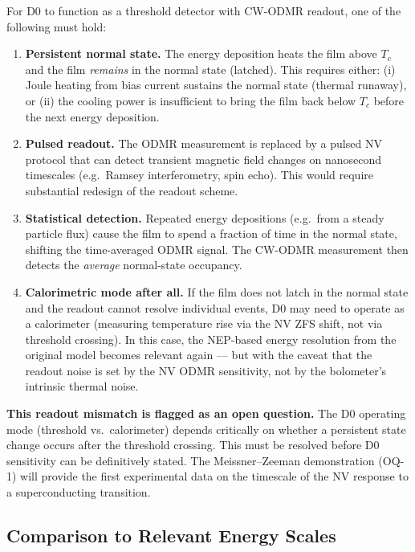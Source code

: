 For D0 to function as a threshold detector with CW-ODMR readout, one of the
following must hold:

\begin{enumerate}
  \item[(a)] \textbf{Persistent normal state.} The energy deposition heats
    the film above $T_c$ and the film \emph{remains} in the normal state
    (latched). This requires either: (i) Joule heating from bias current
    sustains the normal state (thermal runaway), or (ii) the cooling power
    is insufficient to bring the film back below $T_c$ before the next
    energy deposition.

  \item[(b)] \textbf{Pulsed readout.} The ODMR measurement is replaced by a
    pulsed NV protocol that can detect transient magnetic field changes on
    nanosecond timescales (e.g.\ Ramsey interferometry, spin echo). This
    would require substantial redesign of the readout scheme.

  \item[(c)] \textbf{Statistical detection.} Repeated energy depositions
    (e.g.\ from a steady particle flux) cause the film to spend a fraction
    of time in the normal state, shifting the time-averaged ODMR signal.
    The CW-ODMR measurement then detects the \emph{average} normal-state
    occupancy.

  \item[(d)] \textbf{Calorimetric mode after all.} If the film does not
    latch in the normal state and the readout cannot resolve individual
    events, D0 may need to operate as a calorimeter (measuring temperature
    rise via the NV ZFS shift, not via threshold crossing). In this case,
    the NEP-based energy resolution from the original model becomes
    relevant again --- but with the caveat that the readout noise is set by
    the NV ODMR sensitivity, not by the bolometer's intrinsic thermal noise.
\end{enumerate}

\textbf{This readout mismatch is flagged as an open question.} The D0
operating mode (threshold vs.\ calorimeter) depends critically on whether a
persistent state change occurs after the threshold crossing. This must be
resolved before D0 sensitivity can be definitively stated. The Meissner--Zeeman
demonstration (OQ-1) will provide the first experimental data on the
timescale of the NV response to a superconducting transition.

\subsection{Comparison to Relevant Energy Scales}
\label{sec:oq5_comparison}

